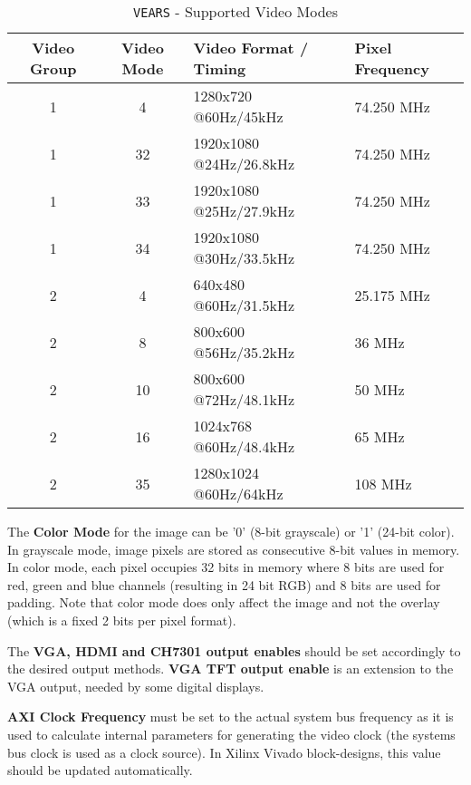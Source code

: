 \begin{table}[htb]
\centering
\begin{tabular}[t]{|c|c|l|l|}
  \hline
  \textbf{Video Group} & \textbf{Video Mode} & Video Format / Timing     & Pixel Frequency \\ \hline
  1                    &  4                  & 1280x720 @60Hz/45kHz      & 74.250 MHz  \\ \hline
  1                    &  32                 & 1920x1080 @24Hz/26.8kHz   & 74.250 MHz  \\ \hline
  1                    &  33                 & 1920x1080 @25Hz/27.9kHz   & 74.250 MHz  \\ \hline
  1                    &  34                 & 1920x1080 @30Hz/33.5kHz   & 74.250 MHz  \\ \hline
  \hline
  2                    &  4                  & 640x480 @60Hz/31.5kHz     & 25.175 MHz  \\ \hline
  2                    &  8                  & 800x600 @56Hz/35.2kHz     & 36 MHz      \\ \hline
  2                    &  10                 & 800x600 @72Hz/48.1kHz     & 50 MHz      \\ \hline
  2                    &  16                 & 1024x768 @60Hz/48.4kHz    & 65 MHz      \\ \hline
  2                    &  35                 & 1280x1024 @60Hz/64kHz     & 108 MHz     \\ \hline
\end{tabular}
\caption{\texttt{VEARS} - Supported Video Modes}
\label{07-vears-video-modes}
\end{table}


The \textbf{Color Mode} for the image can be '0' (8-bit grayscale) or '1' (24-bit color). In grayscale mode, image pixels are stored as consecutive 8-bit values in memory. In color mode, each pixel occupies 32 bits in memory where 8 bits are used for red, green and blue channels (resulting in 24 bit RGB) and 8 bits are used for padding. Note that color mode does only affect the image and not the overlay (which is a fixed 2 bits per pixel format).


The \textbf{VGA, HDMI and CH7301 output enables} should be set accordingly to the desired output methods. 
\textbf{VGA TFT output enable} is an extension to the VGA output, needed by some digital displays. 


\textbf{AXI Clock Frequency} must be set to the actual system bus frequency as it is used to calculate internal parameters for generating the video clock (the systems bus clock is used as a clock source). In Xilinx Vivado block-designs, this value should be updated automatically. 


